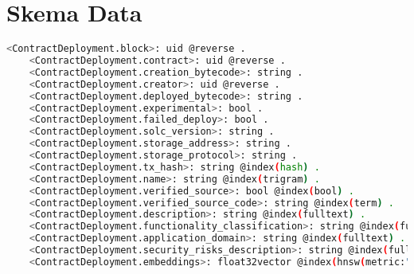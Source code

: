 \chapter{Skema Data}
\label{appendix:skema-data}

\begin{lstlisting}[language=bash]
    <ContractDeployment.block>: uid @reverse .
    <ContractDeployment.contract>: uid @reverse .
    <ContractDeployment.creation_bytecode>: string .
    <ContractDeployment.creator>: uid @reverse .
    <ContractDeployment.deployed_bytecode>: string .
    <ContractDeployment.experimental>: bool .
    <ContractDeployment.failed_deploy>: bool .
    <ContractDeployment.solc_version>: string .
    <ContractDeployment.storage_address>: string .
    <ContractDeployment.storage_protocol>: string .
    <ContractDeployment.tx_hash>: string @index(hash) .
    <ContractDeployment.name>: string @index(trigram) .
    <ContractDeployment.verified_source>: bool @index(bool) .
    <ContractDeployment.verified_source_code>: string @index(term) .
    <ContractDeployment.description>: string @index(fulltext) .
    <ContractDeployment.functionality_classification>: string @index(fulltext) .
    <ContractDeployment.application_domain>: string @index(fulltext) .
    <ContractDeployment.security_risks_description>: string @index(fulltext) .
    <ContractDeployment.embeddings>: float32vector @index(hnsw(metric:"euclidean")) .
\end{lstlisting}

